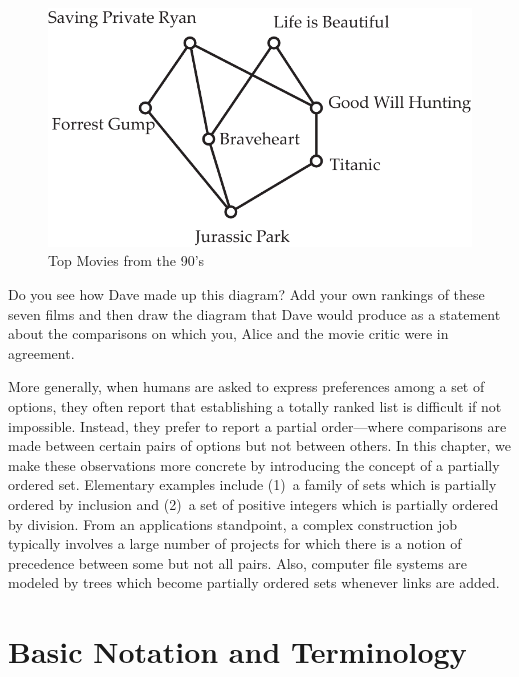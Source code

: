 \begin{figure}
\begin{center}
\includegraphics*[scale=.4]{posets-figs/movies.pdf}
\caption{Top Movies from the 90's}
\label{fig:movies}
\end{center}
\end{figure}

\begin{remark}
Do you see how Dave made up this diagram?  Add your own rankings of these
seven films and then draw the diagram that Dave would produce as a statement
about the comparisons on which you, Alice and the movie critic were in agreement.
\end{remark}

More generally, when humans are asked to express preferences among 
a set of options, they often report that establishing a totally ranked list 
is difficult if not impossible.  Instead, they prefer to report a partial 
order---where comparisons are made between certain pairs of options but not 
between others.  In this chapter, we
make these observations more concrete by introducing the concept of 
a partially ordered set.  Elementary examples include (1)~a family of sets which is 
partially ordered by inclusion and (2)~a set of positive integers which is
partially ordered by division.  From an applications standpoint, a
complex construction job typically involves a large number of projects
for which there is a notion of precedence between some but not all pairs.
Also, computer file systems are modeled by trees which become partially 
ordered sets whenever links are added.

\section{Basic Notation and Terminology}\label{s:posets:intro}

